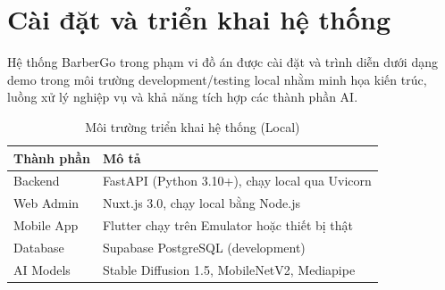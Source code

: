 \section{Cài đặt và triển khai hệ thống}

Hệ thống BarberGo trong phạm vi đồ án được cài đặt và trình diễn dưới dạng demo trong môi trường development/testing local nhằm minh họa kiến trúc, luồng xử lý nghiệp vụ và khả năng tích hợp các thành phần AI.



\begin{table}[H]
\centering
\caption{Môi trường triển khai hệ thống (Local)}
\label{tab:environment}
\begin{tabular}{|p{4cm}|p{9.5cm}|}
\hline
\textbf{Thành phần} & \textbf{Mô tả} \\
\hline
Backend & FastAPI (Python 3.10+), chạy local qua Uvicorn \\
Web Admin & Nuxt.js 3.0, chạy local bằng Node.js \\
Mobile App & Flutter chạy trên Emulator hoặc thiết bị thật \\
Database & Supabase PostgreSQL (development) \\
AI Models & Stable Diffusion 1.5, MobileNetV2, Mediapipe \\
\hline
\end{tabular}
\end{table}
